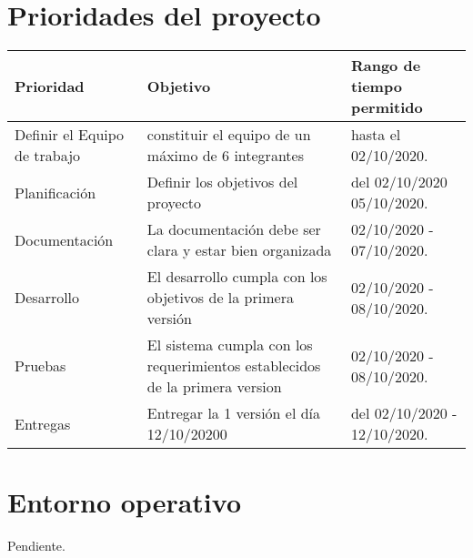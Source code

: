 \documentclass[12pt,a4paper]{book}
\begin{document}
\section{Prioridades del proyecto}
\vspace{0.5 cm}
\begin{table}[h!]
\begin{tabular}{|p{5 cm}|p{5 cm}|p{5 cm}|}
\hline
\textbf{Prioridad}&\textbf{Objetivo}&\textbf{Rango de tiempo permitido}
\\\hline
Definir el Equipo de trabajo&constituir el equipo de un máximo de 6 integrantes& hasta el 02/10/2020.\\\hline
Planificación&Definir los objetivos del proyecto & del 02/10/2020 05/10/2020.\\\hline
Documentación&La documentación debe ser clara y estar bien organizada& 02/10/2020 - 07/10/2020.\\\hline
Desarrollo&El desarrollo cumpla con los objetivos de la primera versión& 02/10/2020 - 08/10/2020.\\\hline
Pruebas&El sistema cumpla con los requerimientos establecidos de la primera version& 02/10/2020 - 08/10/2020.\\\hline
Entregas&Entregar la 1 versión el día 12/10/20200 & del 02/10/2020 - 12/10/2020.\\\hline
\end{tabular}
\end{table}

\section{Entorno operativo}
\vspace{0.5 cm}
Pendiente.

  
\end{document}
